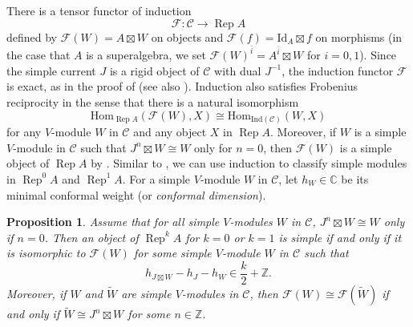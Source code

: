 \documentclass[11pt, reqno]{amsart}
\newtheorem{prop}[thm]{Proposition}
\theoremstyle{definition}\newtheorem{defi}[thm]{Definition}
\theoremstyle{definition}\newtheorem{rem}[thm]{Remark}
\theoremstyle{definition}\newtheorem{exam}[thm]{Example}
\theoremstyle{definition}\newtheorem{assum}[thm]{Assumption}
\newcommand{\cF}{\mathcal{F}}
\newcommand{\cC}{\mathcal{C}}
\newcommand{\til}{\widetilde}
\newcommand{\CC}{\mathbb{C}}
\newcommand{\ZZ}{\mathbb{Z}}
\newcommand{\Id}{\mathrm{Id}}
\newcommand{\tens}{\boxtimes}
\newcommand{\ind}{\mathrm{Ind}}
\DeclareMathOperator{\rep}{Rep}
\newcommand{\repA}{\rep A}
\begin{document}
There is a tensor functor of induction
\begin{equation*}
 \cF: \cC\longrightarrow\repA
\end{equation*}
defined by $\cF(W)=A\tens W$ on objects and $\cF(f)=\Id_A\tens f$ on morphisms (in the case that $A$ is a superalgebra, we set $\cF(W)^{\overline{i}}=A^{\overline{i}}\tens W$ for $i=0,1$). Since the simple current $J$ is a rigid object of $\cC$ with dual $J^{-1}$, the induction functor $\cF$ is exact, as in the proof of \cite[Proposition 3.2.4]{CMY-singlet} (see also \cite[Remark 3.21]{CKL}). Induction also satisfies Frobenius reciprocity in the sense that there is a natural isomorphism
\begin{equation*}
\mathrm{Hom}_{\repA}(\cF(W),X)\cong\mathrm{Hom}_{\ind(\cC)}(W,X)
\end{equation*}
for any $V$-module $W$ in $\cC$ and any object $X$ in $\repA$. Moreover, if $W$ is a simple $V$-module in $\cC$ such that $J^n\tens W\cong W$ only for $n=0$, then $\cF(W)$ is a simple object of $\repA$ by \cite[Proposition 4.4]{CKM-exts}. Similar to \cite[Proposition 5.0.1]{CMY3}, we can use induction to classify simple modules in $\rep^0A$ and $\rep^1A$. For a simple $V$-module $W$ in $\cC$, let $h_W\in\CC$ be its minimal conformal weight (or \textit{conformal dimension}).
\begin{prop}\label{prop:general_simple_module_classification}
Assume that for all simple $V$-modules $W$ in $\cC$, $J^n\tens W\cong W$ only if $n=0$. Then an object of $\rep^kA$ for $k=0$ or $k=1$ is simple if and only if it is isomorphic to $\cF(W)$ for some simple $V$-module $W$ in $\cC$ such that
\begin{equation*}
h_{J\tens W}-h_J-h_W\in\frac{k}{2}+\ZZ.
\end{equation*}
Moreover, if $W$ and $\til{W}$ are simple $V$-modules in $\cC$, then $\cF(W)\cong\cF(\til{W})$ if and only if $\til{W}\cong J^n\tens W$ for some $n\in\ZZ$.
\end{prop}
\end{document}
